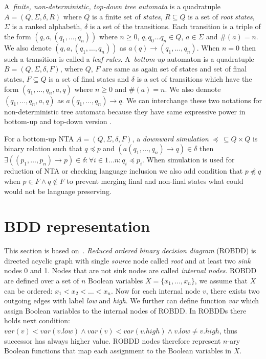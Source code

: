 \documentclass[a4paper, 12pt]{article}
\begin{document}
A~\emph{finite, non-deterministic, top-down tree automata} is a quadratuple $A=(Q, \Sigma, \delta, R)$ where
$Q$ is a finite set of \emph{states}, $R\subseteq Q$ is a set of \emph{root states}, $\Sigma$ is a ranked alphabeth,
$\delta$ is a set of the transitions.
Each transition is a triple of the form $(q,a,(q_1, \ldots, q_n))$ where $n \geq 0$, $q, q_0 \ldots q_n \in Q$, $a \in \Sigma$ and $\#(a) = n$.
We also denote $(q,a,(q_1, \ldots, q_n))$ as $a(q) \rightarrow (q_1, \ldots, q_n)$.
When $n = 0$ then such a transition is called a \emph{leaf rules}.
A~\emph{bottom-up} automaton is a quadratuple $B=(Q, \Sigma, \delta, F)$, where $Q$, $F$ are same as again set of states and set of final states, $F\subseteq Q$
is a set of final states and $\delta$ is a set of transitions which have the form $(q_1,\ldots, q_n,a,q)$ where $n \geq 0$ and $\#(a) = n$.
We also dennote $(q_1,\ldots, q_n,a,q)$ as $a(q_1, \ldots, q_n) \rightarrow q$.
We can interchange these two notations for non-deterministic tree automata because they have same expressive power in bottom-up and top-down version \cite{tata}.

For a bottom-up NTA $A=(Q, \Sigma, \delta, F)$, a \emph{downward simulation} $\preceq\, \subseteq Q\times Q$ is binary relation such that $q \preceq p$
and $(a(q_1,\ldots, q_n) \rightarrow q) \in \delta$ then $\exists ((p_1, \ldots, p_n) \rightarrow p) \in \delta: \forall i \in {1 \ldots n}: q_i \preceq p_i$.
When simulation is used for reduction of NTA or checking language inclusion we also add condition that $p \not\preceq q$ when $p \in F \wedge q \notin F$
to prevent merging final and non-final states what could would not be language preserving.

\section{BDD representation}
\label{sec:bdd}

This section is based on~\cite{fiedor:wsks}. \textit{Reduced ordered binary decision diagram} (ROBDD) is directed acyclic graph with single \textit{source} node called \textit{root} and at least two \textit{sink} nodes 0 and 1. Nodes that are not sink nodes are called \textit{internal nodes}. ROBDD are defined over a set of $n$ Boolean variables $X = \{x_1, \dots, x_n\}$, we assume that $X$ can be ordered: $x_1 < x_2 < \dots < x_n$. Now for each internal node $v$, there exists two outgoing edges with label \textit{low} and \textit{high}. We further can define function \textit{var} which assign Boolean variables to the internal nodes of ROBDD. In ROBDDs there holds next condition: $var(v) < var(v.low) \wedge var(v) < var(v.high) \wedge v.low \neq v.high$, thus successor has always higher value. ROBDD nodes therefore represent $n$-ary Boolean functions that map each assignment to the Boolean variables in $X$.
\end{document}
